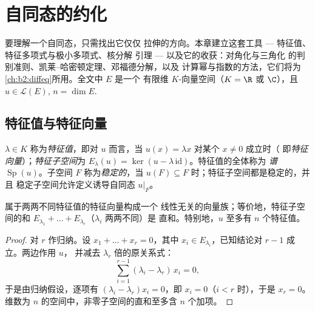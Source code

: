 \chapter{自同态的约化}\label{ch:b2:reduction}

要理解一个自同态，只需找出它仅仅
拉伸的方向。本章建立这套工具 --- 特征值、
特征多项式与极小多项式、核分解
引理 --- 以及它的收获：对角化与三角化
的判别准则、凯莱--哈密顿定理、邓福德分解，以及
计算幂与指数的方法，它们将为
\cref{ch:b2:diffeq}所用。全文中 $E$ 是一个
有限维 $K$-向量空间（$K = \R$ 或 $\C$），且 $u \in
\mathcal{L}(E)$, $n = \dim E$.

\section{特征值与特征向量}

\begin{definition}\label{def:b2:reduction:eigen}
$\lambda \in K$ 称为\emph{特征值}，即对 $u$ 而言，当
$u(x) = \lambda x$ 对某个 $x \neq 0$ 成立时（
即\emph{特征向量}）；\emph{特征子空间}为 $E_\lambda(u) =
\ker(u - \lambda\,\mathrm{id})$。特征值的全体称为
\emph{谱} $\operatorname{Sp}(u)$。子空间 $F$
称为\emph{稳定的}，当 $u(F) \subseteq F$ 时；特征子空间都是稳定的，并且
稳定子空间允许定义诱导自同态 $u|_F$。
\end{definition}

\begin{theorem}[特征子空间的独立性]\label{thm:b2:reduction:independence}
属于两两不同特征值的特征向量构成一个
线性无关的向量族；等价地，特征子空间的和
$E_{\lambda_1} + \dots + E_{\lambda_r}$（$\lambda_i$ 两两不同）是
直和。特别地，$u$ 至多有 $n$ 个特征值。
\end{theorem}

\begin{proof}
对 $r$ 作归纳。设 $x_1 + \dots + x_r = 0$，其中 $x_i \in
E_{\lambda_i}$，已知结论对 $r - 1$ 成立。两边作用 $u$，
并减去 $\lambda_r$ 倍的原关系式：
\[
\sum_{i=1}^{r-1} (\lambda_i - \lambda_r)\, x_i = 0 ,
\]
于是由归纳假设，逐项有 $(\lambda_i - \lambda_r)x_i = 0$，即 $x_i =
0$（$i < r$ 时），于是 $x_r = 0$。
维数为 $n$ 的空间中，非零子空间的直和至多含 $n$ 个加项。
\end{proof}

